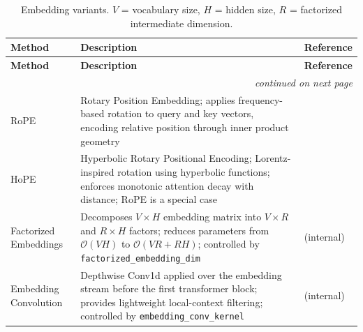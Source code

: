 \small
\begin{longtable}{p{3.0cm}p{7.5cm}p{3.5cm}}
\toprule
\textbf{Method} & \textbf{Description} & \textbf{Reference} \\
\midrule
\endfirsthead
\toprule
\textbf{Method} & \textbf{Description} & \textbf{Reference} \\
\midrule
\endhead
\midrule
\multicolumn{3}{r}{\textit{continued on next page}} \\
\endfoot
\bottomrule
\caption{Embedding variants. $V$ = vocabulary size, $H$ = hidden size, $R$ = factorized intermediate dimension.}
\label{tab:all-embeddings}
\endlastfoot
RoPE & Rotary Position Embedding; applies frequency-based rotation to query and key vectors, encoding relative position through inner product geometry & \citep{su_rope_2024} \\
HoPE & Hyperbolic Rotary Positional Encoding; Lorentz-inspired rotation using hyperbolic functions; enforces monotonic attention decay with distance; RoPE is a special case & \citep{dai_hope_2025} \\
Factorized Embeddings & Decomposes $V \times H$ embedding matrix into $V \times R$ and $R \times H$ factors; reduces parameters from $\mathcal{O}(VH)$ to $\mathcal{O}(V R + R H)$; controlled by \texttt{factorized\_embedding\_dim} & (internal) \\
Embedding Convolution & Depthwise Conv1d applied over the embedding stream before the first transformer block; provides lightweight local-context filtering; controlled by \texttt{embedding\_conv\_kernel} & (internal) \\
\bottomrule
\end{longtable}
\normalsize
